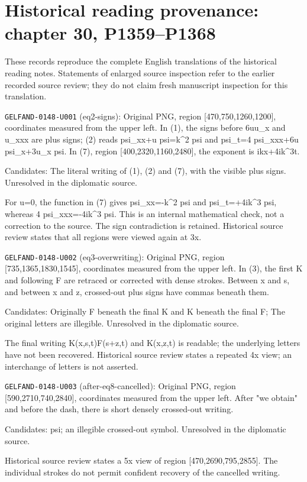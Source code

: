 \section*{Historical reading provenance: chapter 30, P1359--P1368}
These records reproduce the complete English translations of the historical reading notes. Statements of enlarged source inspection refer to the earlier recorded source review; they do not claim fresh manuscript inspection for this translation.\par

\noindent\texttt{GELFAND-0148-U001} (eq2-signs): Original PNG, region [470,750,1260,1200], coordinates measured from the upper left. In (1), the signs before 6uu\_x and u\_xxx are plus signs; (2) reads psi\_xx+u psi=k\textasciicircum{}2 psi and psi\_t=4 psi\_xxx+6u psi\_x+3u\_x psi. In (7), region [400,2320,1160,2480], the exponent is ikx+4ik\textasciicircum{}3t.\par
Candidates: The literal writing of (1), (2) and (7), with the visible plus signs. Unresolved in the diplomatic source.\par
For u=0, the function in (7) gives psi\_xx=-k\textasciicircum{}2 psi and psi\_t=+4ik\textasciicircum{}3 psi, whereas 4 psi\_xxx=-4ik\textasciicircum{}3 psi. This is an internal mathematical check, not a correction to the source. The sign contradiction is retained. Historical source review states that all regions were viewed again at 3x.\par

\noindent\texttt{GELFAND-0148-U002} (eq3-overwriting): Original PNG, region [735,1365,1830,1545], coordinates measured from the upper left. In (3), the first K and following F are retraced or corrected with dense strokes. Between x and s, and between x and z, crossed-out plus signs have commas beneath them.\par
Candidates: Originally F beneath the final K and K beneath the final F; The original letters are illegible. Unresolved in the diplomatic source.\par
The final writing K(x,s,t)F(s+z,t) and K(x,z,t) is readable; the underlying letters have not been recovered. Historical source review states a repeated 4x view; an interchange of letters is not asserted.\par

\noindent\texttt{GELFAND-0148-U003} (after-eq8-cancelled): Original PNG, region [590,2710,740,2840], coordinates measured from the upper left. After "we obtain" and before the dash, there is short densely crossed-out writing.\par
Candidates: psi; an illegible crossed-out symbol. Unresolved in the diplomatic source.\par
Historical source review states a 5x view of region [470,2690,795,2855]. The individual strokes do not permit confident recovery of the cancelled writing.\par

